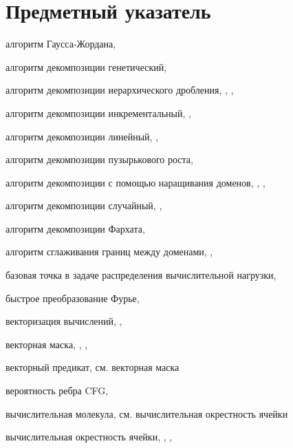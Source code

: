 \newpage

\section*{Предметный указатель}

алгоритм Гаусса-Жордана, \pageref{term:alg_gauss_zhordan}

алгоритм декомпозиции генетический, \pageref{term:alg_decomp_gen}

алгоритм декомпозиции иерархического дробления, \pageref{term:alg_decomp_hierarch}, \pageref{term:alg_decomp_hierarch2}, \pageref{term:alg_decomp_hierarch3}

алгоритм декомпозиции инкрементальный, \pageref{term:alg_decomp_inc}, \pageref{term:alg_decomp_inc2}

алгоритм декомпозиции линейный, \pageref{term:alg_decomp_linear}, \pageref{term:alg_decomp_linear2}

алгоритм декомпозиции пузырькового роста, \pageref{term:alg_decomp_bubble}

алгоритм декомпозиции с помощью наращивания доменов, \pageref{term:alg_decomp_rgrow}, \pageref{term:alg_decomp_rgrow2}, \pageref{term:alg_decomp_rgrow3}

алгоритм декомпозиции случайный, \pageref{term:alg_decomp_random}, \pageref{term:alg_decomp_random2}

алгоритм декомпозиции Фархата, \pageref{term:alg_decomp_farhat}

алгоритм сглаживания границ между доменами, \pageref{term:alg_smooth_domains_border}, \pageref{term:alg_smooth_domains_border2}

базовая точка в задаче распределения вычислительной нагрузки, \pageref{term:distr_base_point}

быстрое преобразование Фурье, \pageref{term:furier_transform}

векторизация вычислений, \pageref{term:vectorization}, \pageref{term:vectorization2}

векторная маска, \pageref{term:vector_mask}, \pageref{term:vector_mask2}, \pageref{term:vector_mask3}

векторный предикат, см. векторная маска

вероятность ребра CFG, \pageref{term:edge_prob}

вычислительная молекула, см. вычислительная окрестность ячейки

вычислительная окрестность ячейки, \pageref{term:cell_calc_template}, \pageref{term:cell_calc_template2}, \pageref{term:cell_calc_template3}

